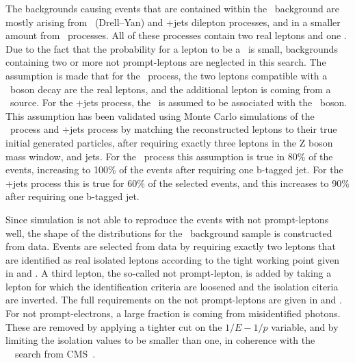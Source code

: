 The backgrounds causing events that are contained within the \NPL\ background  are mostly arising from \DY\ (Drell--Yan) and \ttbar+jets dilepton processes, and in a smaller amount from \WW\ processes. All of these processes contain two real leptons and one \NPL. Due to the fact that the probability for a lepton to be a \NPL\ is small, backgrounds containing two or more  not prompt-leptons are neglected in this search. The assumption is made that for the \DY\ process, the two leptons compatible with a \PZ\ boson decay are the real leptons, and the additional lepton is coming from a \NPL\ source. For the \ttbar+jets process, the \NPL\ is assumed to be associated with the \PZ\ boson. This assumption has been validated using Monte Carlo simulations of the \DY\ process and \ttbar+jets process by matching the reconstructed leptons to their true initial generated particles, after requiring exactly three leptons in the Z boson mass window, and jets. For the \DY\ process this assumption is true in 80\% of the events, increasing to 100\% of the events after requiring one b-tagged jet. For the \ttbar+jets process this is true for 60\% of the selected events, and this increases to 90\% after requiring one b-tagged jet.

Since simulation is not able to reproduce the events with not prompt-leptons well, the shape of the distributions for the \NPL\ background sample is constructed from data. Events are selected from data by requiring exactly  two leptons that are identified as real isolated leptons according to the tight working point given in  and . A third lepton, the so-called not prompt-lepton,  is added by taking a lepton for which the identification criteria are loosened and the isolation citeria are inverted. The full  requirements on the not prompt-leptons are given in  and . For not prompt-electrons, a large fraction is coming from misidentified photons. These are removed by applying a tighter cut on the $1/E-1/p$ variable, and by limiting the isolation values to be smaller than one, in coherence with the \SM\ \tZq\ search from CMS~\cite{CMS-PAS-TOP-16-020}. 

